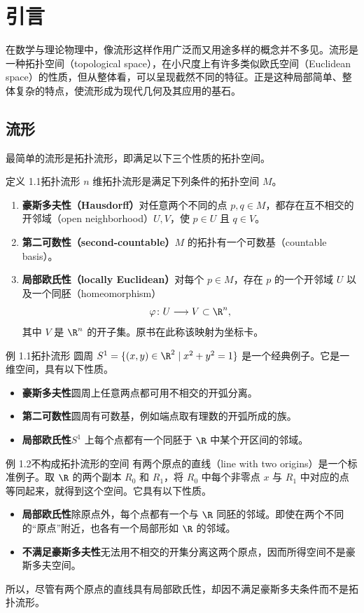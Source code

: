 \section{引言}
在数学与理论物理中，像流形这样作用广泛而又用途多样的概念并不多见。流形是一种拓扑空间（topological space），在小尺度上有许多类似欧氏空间（Euclidean space）的性质，但从整体看，可以呈现截然不同的特征。正是这种局部简单、整体复杂的特点，使流形成为现代几何及其应用的基石。

\subsection{流形}
最简单的流形是拓扑流形，即满足以下三个性质的拓扑空间。

\begin{statement}{定义 1.1}{拓扑流形}
$n$ 维拓扑流形是满足下列条件的拓扑空间 $M$。
\begin{enumerate}
  \item \textbf{豪斯多夫性（Hausdorff）}\quad 对任意两个不同的点 $p,q\in M$，都存在互不相交的开邻域（open neighborhood）$U,V$，使 $p\in U$ 且 $q\in V$。
  \item \textbf{第二可数性（second-countable）}\quad $M$ 的拓扑有一个可数基（countable basis）。
  \item \textbf{局部欧氏性（locally Euclidean）}\quad 对每个 $p\in M$，存在 $p$ 的一个开邻域 $U$ 以及一个同胚（homeomorphism）
  \[
    \varphi\colon U\longrightarrow V\subset\R^n,
  \]
  其中 $V$ 是 $\R^n$ 的开子集。原书在此称该映射为坐标卡。
\end{enumerate}
\end{statement}

\begin{statement}{例 1.1}{拓扑流形}
圆周 $S^1=\{(x,y)\in\R^2\mid x^2+y^2=1\}$ 是一个经典例子。它是一维空间，具有以下性质。
\begin{itemize}
  \item \textbf{豪斯多夫性}\quad 圆周上任意两点都可用不相交的开弧分离。
  \item \textbf{第二可数性}\quad 圆周有可数基，例如端点取有理数的开弧所成的族。
  \item \textbf{局部欧氏性}\quad $S^1$ 上每个点都有一个同胚于 $\R$ 中某个开区间的邻域。
\end{itemize}
\end{statement}

\begin{statement}{例 1.2}{不构成拓扑流形的空间}
有两个原点的直线（line with two origins）是一个标准例子。取 $\R$ 的两个副本 $R_0$ 和 $R_1$，将 $R_0$ 中每个非零点 $x$ 与 $R_1$ 中对应的点等同起来，就得到这个空间。它具有以下性质。
\begin{itemize}
  \item \textbf{局部欧氏性}\quad 除原点外，每个点都有一个与 $\R$ 同胚的邻域。即使在两个不同的“原点”附近，也各有一个局部形如 $\R$ 的邻域。
  \item \textbf{不满足豪斯多夫性}\quad 无法用不相交的开集分离这两个原点，因而所得空间不是豪斯多夫空间。
\end{itemize}
所以，尽管有两个原点的直线具有局部欧氏性，却因不满足豪斯多夫条件而不是拓扑流形。
\end{statement}

